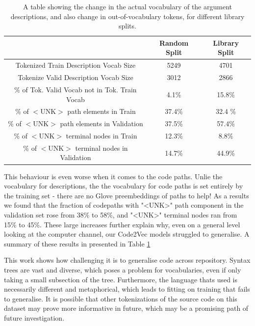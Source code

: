 \begin{table}
    \begin{center}
        \begin{tabular}{c c c}
           \hline
            & Random Split & Library Split \\
            \hline
            Tokenized Train Description Vocab Size    & 5249  &  4701 \\
            Tokenize Valid Description Vocab Size    & 3012  &  2866 \\
            \% of Tok. Valid Vocab not in Tok. Train Vocab                & 4.1\% &  15.8\% \\
            \hline
            \% of $<$UNK$>$ path elements in Train          &  37.4\%  &  32.4 \%   \\
            \% of $<$UNK$>$ path elements in Validation     &  37.5\%  &  57.4\% \\
            \% of $<$UNK$>$ terminal nodes in Train         &  12.3\%  &  8.8\%  \\ 
            \% of $<$UNK$>$ terminal nodes in Validation    &  14.7\% &  44.9\% \\   
            \hline
        \end{tabular}
    \end{center}
    \caption{A table showing the change in the actual vocabulary of the argument descriptions, and also change in out-of-vocabulary tokens, for different library splits.}
    \label{tab:vocabsplit}
\end{table}



This behaviour is even worse when it comes to the code paths.
Unlie the vocabulary for descriptions, the the vocabulary for code paths is set entirely by the training set - there are no Glove preembeddings of paths to help!
As a results we found that the fraction of codepaths with "<UNK>" path component in the validation set rose from 38\% to 58\%, and "<UNK>" terminal nodes ran from 15\% to 45\%. 
These large increases further explain why, even on a general level looking at the computer channel, our Code2Vec models struggled to generalise. A summary of these results in presented in Table \ref{tab:vocabsplit}

This work shows how challenging it is to generalise code across repository. Syntax trees are vast and diverse, which poses a problem for vocabularies, even if only taking a small subsection of the tree. 
Furthermore, the language thats used is necessarily different and metaphorical, which leads to fitting on training that fails to generalise.
It is possible that other tokenizations of the source code on this dataset may prove more informative in future, which may be a promising path of future investigation.




